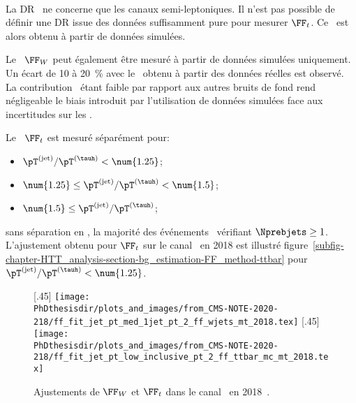 \paragraph{\ttbar}
La DR \ttbar\ ne concerne que les canaux semi-leptoniques.
Il n'est pas possible de définir une DR issue des données suffisamment pure pour mesurer $\FF_t$.
Ce \fakefactor\ est alors obtenu à partir de données simulées.
\par
Le \fakefactor\ $\FF_W$ peut également être mesuré à partir de données simulées uniquement.
Un écart de \num{10} à \SI{20}{\%} avec le \fakefactor\ obtenu à partir des données réelles est observé.
La contribution \ttbar\ étant faible par rapport aux autres bruits de fond rend négligeable le biais introduit par l'utilisation de données simulées face aux incertitudes sur les \fakefactors.
\par
Le \fakefactor\ $\FF_t$ est mesuré séparément pour:
\begin{itemize}
\item $\pT^{(\text{jet})}/\pT^{(\tauh)} < \num{1.25}$;
\item $\num{1.25} \leq \pT^{(\text{jet})}/\pT^{(\tauh)} < \num{1.5}$;
\item $\num{1.5} \leq \pT^{(\text{jet})}/\pT^{(\tauh)}$;
\end{itemize}
sans séparation en \Nprebjets, la majorité des événements \ttbar\ vérifiant $\Nprebjets\geq1$.
L'ajustement obtenu pour $\FF_t$ sur le canal \mu\tauh\ en 2018 est illustré figure~\ref{subfig-chapter-HTT_analysis-section-bg_estimation-FF_method-ttbar} pour $\pT^{(\text{jet})}/\pT^{(\tauh)} < \num{1.25}$.
\begin{figure}[h]
\centering

[.45\textwidth]
{\texttt{[image: \\PhDthesisdir/plots\_and\_images/from\_CMS-NOTE-2020-218/ff\_fit\_jet\_pt\_med\_1jet\_pt\_2\_ff\_wjets\_mt\_2018.tex]}}
\hfill
{}[.45\textwidth]
{\texttt{[image: \\PhDthesisdir/plots\_and\_images/from\_CMS-NOTE-2020-218/ff\_fit\_jet\_pt\_low\_inclusive\_pt\_2\_ff\_ttbar\_mc\_mt\_2018.tex]}}

\caption[Ajustements de $\FF_W$ et $\FF_t$ dans le canal \mu\tauh\ en 2018.]{Ajustements de $\FF_W$ et $\FF_t$ dans le canal \mu\tauh\ en 2018~\cite{CMS-NOTE-2020-218}.}
\label{fig-chapter-HTT_analysis-section-bg_estimation-FF_method-WJ-ttbar}
\end{figure}
